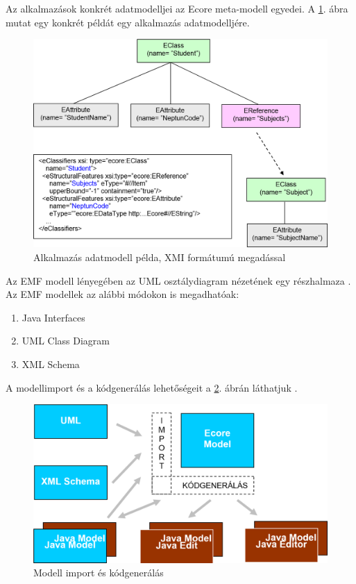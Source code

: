 Az alkalmazások konkrét adatmodelljei az Ecore meta-modell egyedei.
A \ref{fig:DataModelWithXMI}. ábra mutat egy konkrét példát egy alkalmazás adatmodelljére.
%
\begin{figure}[htb]
\centering
\includegraphics[width=\textwidth]{figures/datamodel-example-with-xmi-desc.png}
\caption{Alkalmazás adatmodell példa, XMI formátumú megadással}
\label{fig:DataModelWithXMI}
\end{figure}
%
Az \gls{EMF} modell lényegében az UML osztálydiagram nézetének egy részhalmaza \cite{EMFFundamentals}.
Az \gls{EMF} modellek az alábbi módokon is megadhatóak:
\begin{enumerate}
	\item Java Interfaces
	\item UML Class Diagram
	\item XML Schema
\end{enumerate}
A modellimport és a kódgenerálás lehetőségeit a \ref{fig:ModelImportAndCodegen}. ábrán láthatjuk \cite{EMFFundamentals}.
%
\begin{figure}[!b]
\centering
\includegraphics[width=\textwidth]{figures/model-import-and-codegen.png}
\caption{Modell import és kódgenerálás}
\label{fig:ModelImportAndCodegen}
\end{figure}
